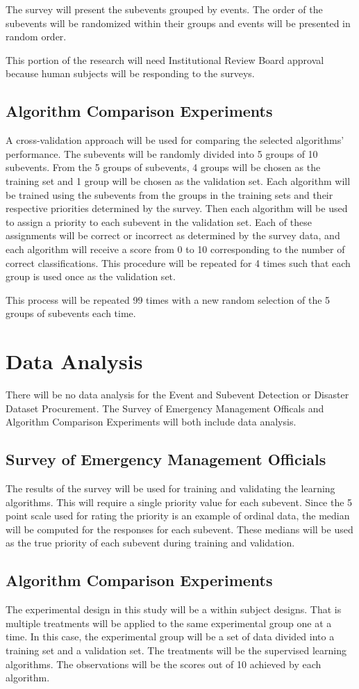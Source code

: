 \documentclass[conference]{IEEEtran}
\begin{document}
The survey will present the subevents grouped by events. The order of the subevents will be randomized within their groups and events will be presented in random order.

This portion of the research will need Institutional Review Board approval because human subjects will be responding to the surveys.
\subsection{Algorithm Comparison Experiments}
A cross-validation approach will be used for comparing the selected algorithms' performance. The subevents will be randomly divided into 5 groups of 10 subevents. From the 5 groups of subevents, 4 groups will be chosen as the training set and 1 group will be chosen as the validation set. Each algorithm will be trained using the subevents from the groups in the training sets and their respective priorities determined by the survey. Then each algorithm will be used to assign a priority to each subevent in the validation set. Each of these assignments will be correct or incorrect as determined by the survey data, and each algorithm will receive a score from 0 to 10 corresponding to the number of correct classifications. This procedure will be repeated for 4 times such that each group is used once as the validation set.

This process will be repeated 99 times with a new random selection of the 5 groups of subevents each time.

\section{Data Analysis}
There will be no data analysis for the Event and Subevent Detection or Disaster Dataset Procurement. The Survey of Emergency Management Officals and Algorithm Comparison Experiments will both include data analysis.
\subsection{Survey of Emergency Management Officials}
The results of the survey will be used for training and validating the learning algorithms. This will require a single priority value for each subevent. Since the 5 point scale used for rating the priority is an example of ordinal data, the median will be computed for the responses for each subevent. These medians will be used as the true priority of each subevent during training and validation.
\subsection{Algorithm Comparison Experiments}
The experimental design in this study will be a within subject designs. That is multiple treatments will be applied to the same experimental group one at a time. In this case, the experimental group will be a set of data divided into a training set and a validation set. The treatments will be the supervised learning algorithms. The observations will be the scores out of 10 achieved by each algorithm.
\end{document}
